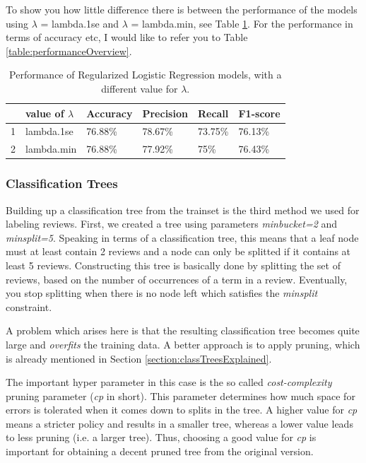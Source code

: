 \documentclass[a4paper,11pt]{article}
\begin{document}
To show you how little difference there is between the performance of the models using $\lambda$ = lambda.1se and $\lambda$ = lambda.min, see Table \ref{table:lambda}. For the performance in terms of accuracy etc, I would like to refer you to Table \ref{table:performanceOverview}.

\begin{table}[H]
\centering
\caption{Performance of Regularized Logistic Regression models, with a different value for $\lambda$.}
\label{table:lambda}
\begin{tabular}{|l|l|l|l|l|l|}
\hline
  & value of $\lambda$ & Accuracy & Precision & Recall  & F1-score \\
  \hline
1 & lambda.1se         & 76.88\%  & 78.67\%   & 73.75\% & 76.13\%  \\
2 & lambda.min         & 76.88\%  & 77.92\%   & 75\%    & 76.43\%  \\
\hline
\end{tabular}
\end{table}
\subsubsection{Classification Trees}
Building up a classification tree from the trainset is the third method we used for labeling reviews. First, we created a tree using parameters \textit{minbucket=2} and \textit{minsplit=5}. Speaking in terms of a classification tree, this means that a leaf node must at least contain 2 reviews and a node can only be splitted if it contains at least 5 reviews. Constructing this tree is basically done by splitting the set of reviews, based on the number of occurrences of a term in a review. Eventually, you stop splitting when there is no node left which satisfies the \textit{minsplit} constraint.

A problem which arises here is that the resulting classification tree becomes quite large and \textit{overfits} the training data. A better approach is to apply pruning, which is already mentioned in Section \ref{section:classTreesExplained}. 

The important hyper parameter in this case is the so called \textit{cost-complexity} pruning parameter (\textit{cp} in short). This parameter determines how much space for errors is tolerated when it comes down to splits in the tree. A higher value for \textit{cp} means a stricter policy and results in a smaller tree, whereas a lower value leads to less pruning (i.e. a larger tree). Thus, choosing a good value for \textit{cp} is important for obtaining a decent pruned tree from the original version.\\
\end{document}

